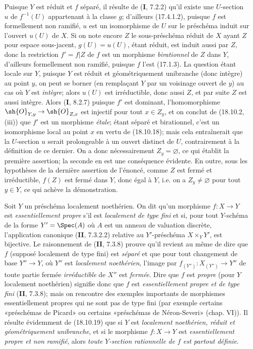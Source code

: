 Puisque $Y$ est réduit et $f$ séparé, il résulte de (\textbf{I}, 7.2.2) qu'il existe une $U$-section $u$ de $f^{-1}(U)$ appartenant à la classe $g$; d'ailleurs (17.4.1.2), puisque $f$ est formellement non ramifié, $u$ est un isomorphisme de $U$ sur le préschéma induit sur l'ouvert $u(U)$ de $X$. Si on note encore $Z$ le sous-préschéma réduit de $X$ ayant $Z$ pour espace sous-jacent, $g(U)=u(U)$, étant réduit, est induit aussi par $Z$, donc la restriction $f'=f|Z$ de $f$ est un morphisme \emph{birationnel} de $Z$ dans $Y$, d'ailleurs formellement non ramifié, puisque $f$ l'est (17.1.3). La question étant locale sur $Y$, puisque $Y$ est réduit et géométriquement unibranche (donc intègre) au point $y$, on peut se borner (en remplaçant $Y$ par un voisinage ouvert de $y$) au cas où $Y$ est \emph{intègre}; alors $u(U)$ est irréductible, donc aussi $Z$, et par suite $Z$ est aussi intègre. Alors (\textbf{I}, 8.2.7) puisque $f'$ est dominant, l'homomorphisme $\sh{O}_{Y,y}\to\sh{O}_{Z,x}$ est injectif pour tout $x\in Z_y$, et on conclut de (18.10.2, (iii)) que $f'$ est un morphisme \emph{étale}; étant séparé et birationnel, c'est un isomorphisme local au point $x$ en vertu de (18.10.18); mais cela entraînerait que la $U$-section $u$ serait prolongeable à un ouvert distinct de $U$, contrairement à la définition de ce dernier. On a donc nécessairement $Z_y=\varnothing$, ce qui établit la première assertion; la seconde en est une conséquence évidente. En outre, sous les hypothèses de la dernière assertion de l'énoncé, comme $Z$ est fermé et irréductible, $f(Z)$ est fermé dans $Y$, donc égal à $Y$, i.e. on a $Z_y\ne\varnothing$ pour tout $y\in Y$, ce qui achève la démonstration.

\begin{remark}[18.10.20]
Soit $Y$ un préschéma localement noethérien. On dit qu'un morphisme $f:X\to Y$ est \emph{essentiellement propre} s'il est \emph{localement de type fini} et si,
pour tout $Y$-schéma de la forme $Y'=\Spec(A)$ où $A$ est un anneau de valuation discrète, l'application canonique (\textbf{II}, 7.3.2.2) relative au $Y'$-préschéma $X\times_Y Y'$, est bijective.
Le raisonnement de (\textbf{II}, 7.3.8) prouve qu'il revient au même de dire que $f$ (supposé localement de type fini) est \emph{séparé} et que pour tout changement de base $Y''\to Y$, où $Y''$ est \emph{localement noethérien}, l'image par $f_{(Y'')}:X_{(Y'')}\to Y''$ de toute partie fermée \emph{irréductible} de $X''$ est \emph{fermée}. Dire que $f$ est \emph{propre} (pour $Y$ localement noethérien) signifie donc que $f$ est \emph{essentiellement propre et de type fini} (\textbf{II}, 7.3.8); mais on rencontre des exemples importants de morphismes essentiellement propres qui ne sont pas de type fini (par exemple certains «préschémas de Picard» ou certains «préschémas de Néron-Severi» (chap. VI)). Il résulte évidemment de (18.10.19) que si $Y$ est \emph{localement noethérien, réduit et géométriquement unibranche}, et si le morphisme $f:X\to Y$ est \emph{essentiellement propre et non ramifié}, alors \emph{toute $Y$-section rationnelle de $f$ est partout définie}.
\end{remark}

